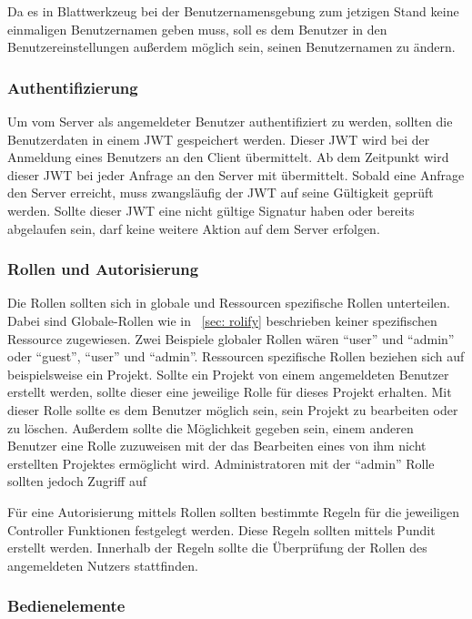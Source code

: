 \documentclass[11pt]{article}
\begin{document}
	Da es in Blattwerkzeug bei der Benutzernamensgebung zum jetzigen Stand keine einmaligen Benutzernamen geben muss, soll es dem Benutzer in den Benutzereinstellungen außerdem möglich sein, seinen Benutzernamen zu ändern. 
	
	\subsubsection{Authentifizierung}
	Um vom Server als angemeldeter Benutzer authentifiziert zu werden, sollten die Benutzerdaten in einem \gls{JWT} gespeichert werden. Dieser \gls{JWT} wird bei der Anmeldung eines Benutzers an den Client übermittelt. Ab dem Zeitpunkt wird dieser \gls{JWT} bei jeder Anfrage an den Server mit übermittelt. Sobald eine Anfrage den Server erreicht, muss zwangsläufig der \gls{JWT} auf seine Gültigkeit geprüft werden. Sollte dieser \gls{JWT} eine nicht gültige Signatur haben oder bereits abgelaufen sein, darf keine weitere Aktion auf dem Server erfolgen.
	
	\subsubsection{Rollen und Autorisierung}
	Die Rollen sollten sich in globale und Ressourcen spezifische Rollen unterteilen. Dabei sind Globale-Rollen wie in ~\ref{sec: rolify} beschrieben keiner spezifischen Ressource zugewiesen. Zwei Beispiele globaler Rollen wären \enquote{user} und \enquote{admin} oder \enquote{guest}, \enquote{user} und \enquote{admin}. Ressourcen spezifische Rollen beziehen sich auf beispielsweise ein Projekt. Sollte ein Projekt von einem angemeldeten Benutzer erstellt werden, sollte dieser eine jeweilige Rolle für dieses Projekt erhalten. Mit dieser Rolle sollte es dem Benutzer möglich sein, sein Projekt zu bearbeiten oder zu löschen. Außerdem sollte die Möglichkeit gegeben sein, einem anderen Benutzer eine Rolle zuzuweisen mit der das Bearbeiten eines von ihm nicht erstellten Projektes ermöglicht wird. Administratoren mit der \enquote{admin} Rolle sollten jedoch Zugriff auf 

	Für eine Autorisierung mittels Rollen sollten bestimmte Regeln für die jeweiligen Controller Funktionen festgelegt werden. Diese Regeln sollten mittels Pundit erstellt werden. Innerhalb der Regeln sollte die Überprüfung der Rollen des angemeldeten Nutzers stattfinden. 
	
	\subsubsection{Bedienelemente}
	
\end{document}
